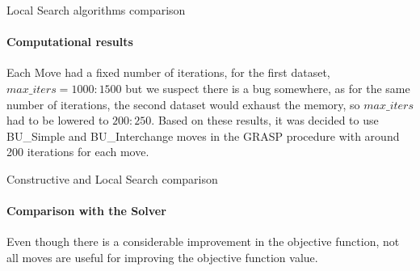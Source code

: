 \documentclass{beamer}
\begin{document}
\begin{frame}{Local Search algorithms comparison}
    \framesubtitle{Computational results}
    \begin{table}
        \centering
        \caption{Summary of the experiment results}
        \label{tab:ls_improv_exp}
    \end{table}
    Each Move had a fixed number of iterations, for the first dataset, $max\_iters = 1000:1500$ but we suspect there is a bug somewhere, as for the same number of iterations, the second dataset would exhaust the memory, so $max\_iters$ had to be lowered to $200:250$.
    Based on these results, it was decided to use BU\_Simple and BU\_Interchange moves in the GRASP procedure with around 200 iterations for each move.
\end{frame}

\begin{frame}{Constructive and Local Search comparison}
    \framesubtitle{Comparison with the Solver}
    \begin{table}
        \centering
        \caption{Summary of the experiment results}
        \label{tab:constructive_ls_optim_comp}
    \end{table}
    Even though there is a considerable improvement in the objective function, not all moves are useful for improving the objective function value.
\end{frame}
\end{document}
